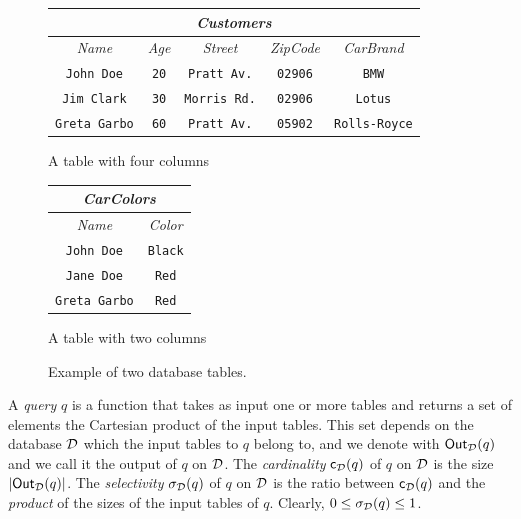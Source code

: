 \begin{figure}[htb]
  \begin{subtable}[b]{0.6\textwidth}
    \centering
    \begin{tabular}{c|c|c|c|c}
      \multicolumn{5}{c}{\emph{Customers}} \\
      \midrule
      \emph{Name} & \emph{Age} & \emph{Street} & \emph{ZipCode} & \emph{CarBrand} \\
      \midrule
      \texttt{John Doe} & \texttt{20} & \texttt{Pratt Av.} & \texttt{02906} & \texttt{BMW} \\
      \texttt{Jim Clark} &  \texttt{30} &\texttt{Morris Rd.} & \texttt{02906} & \texttt{Lotus} \\
      \texttt{Greta Garbo} & \texttt{60} & \texttt{Pratt Av.} & \texttt{05902} & \texttt{Rolls-Royce} \\
      \bottomrule
    \end{tabular}
    \caption{A table with four columns}
  \end{subtable}
  \hfill
  \begin{subtable}[b]{0.3\textwidth}
    \centering
    \begin{tabular}{c|c}
      \multicolumn{2}{c}{\emph{CarColors}} \\
      \midrule
      \emph{Name} & \emph{Color} \\
      \midrule
      \texttt{John Doe} & \texttt{Black} \\
      \texttt{Jane Doe} & \texttt{Red} \\
      \texttt{Greta Garbo} & \texttt{Red}\\ 
      \bottomrule
    \end{tabular}
    \caption{A table with two columns}
  \end{subtable}
  \caption{Example of two database tables.}
  \label{tab:example}
\end{figure}

A \emph{query} $q$ is a function that takes as input one or more tables and
returns a set of elements the Cartesian product of the input tables. This set
depends on the database ${\cal D}$ which the input tables to $q$ belong to, and we
denote with $\mathsf{Out}_{\cal D}(q)$ and we call it the output of $q$ on ${\cal D}$. The
\emph{cardinality} $\mathsf{c}_{\cal D}(q)$ of $q$ on ${\cal D}$ is the size
$|\mathsf{Out}_{\cal D}(q)|$. The \emph{selectivity} $\sigma_{\cal D}(q)$ of $q$ on ${\cal D}$ is
the ratio between $\mathsf{c}_{\cal D}(q)$ and the \emph{product} of the sizes of the
input tables of $q$.  Clearly, $0\le\sigma_{\cal D}(q)\le 1$.

